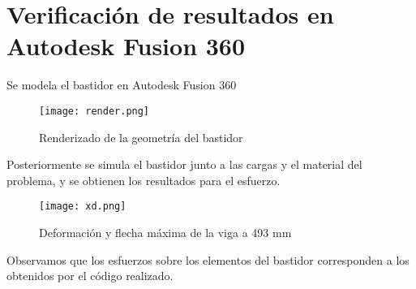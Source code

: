 \documentclass[10pt,a4paper]{article}
\begin{document}
\section{Verificación de resultados en Autodesk Fusion 360}
Se modela el bastidor en Autodesk Fusion 360
\begin{figure}[H]
    \centering
    \texttt{[image: render.png]}
    \caption{Renderizado de la geometría del bastidor}
\end{figure}
Posteriormente se simula el bastidor junto a las cargas y el material del problema, y se obtienen los resultados para el esfuerzo.
\begin{figure}[H]
    \centering
    \texttt{[image: xd.png]}
    \caption{Deformación y flecha máxima de la viga a 493 mm}
\end{figure}
Observamos que los esfuerzos sobre los elementos del bastidor corresponden a los obtenidos por el código realizado.
\newpage
\end{document}
